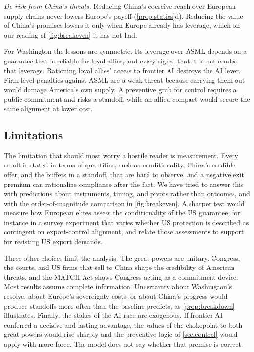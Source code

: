 \emph{De-risk from China's threats.} Reducing China's coercive reach over European supply chains never lowers Europe's payoff (\cref{prop:statics}d). Reducing the value of China's promises lowers it only when Europe already has leverage, which on our reading of \cref{fig:breakeven} it has not had.

For Washington the lessons are symmetric. Its leverage over ASML depends on a guarantee that is reliable for loyal allies, and every signal that it is not erodes that leverage. Rationing loyal allies' access to frontier AI destroys the AI lever. Firm-level penalties against ASML are a weak threat because carrying them out would damage America's own supply. A preventive grab for control requires a public commitment and risks a standoff, while an allied compact would secure the same alignment at lower cost.

\subsection{Limitations}

The limitation that should most worry a hostile reader is measurement. Every result is stated in terms of quantities, such as conditionality, China's credible offer, and the buffers in a standoff, that are hard to observe, and a negative exit premium can rationalize compliance after the fact. We have tried to answer this with predictions about instruments, timing, and pivots rather than outcomes, and with the order-of-magnitude comparison in \cref{fig:breakeven}. A sharper test would measure how European elites assess the conditionality of the US guarantee, for instance in a survey experiment that varies whether US protection is described as contingent on export-control alignment, and relate those assessments to support for resisting US export demands.

Three other choices limit the analysis. The great powers are unitary. Congress, the courts, and US firms that sell to China shape the credibility of American threats, and the MATCH Act shows Congress acting as a commitment device. Most results assume complete information. Uncertainty about Washington's resolve, about Europe's sovereignty costs, or about China's progress would produce standoffs more often than the baseline predicts, as \cref{prop:breakdown} illustrates. Finally, the stakes of the AI race are exogenous. If frontier AI conferred a decisive and lasting advantage, the values of the chokepoint to both great powers would rise sharply and the preventive logic of \cref{sec:control} would apply with more force. The model does not say whether that premise is correct.
